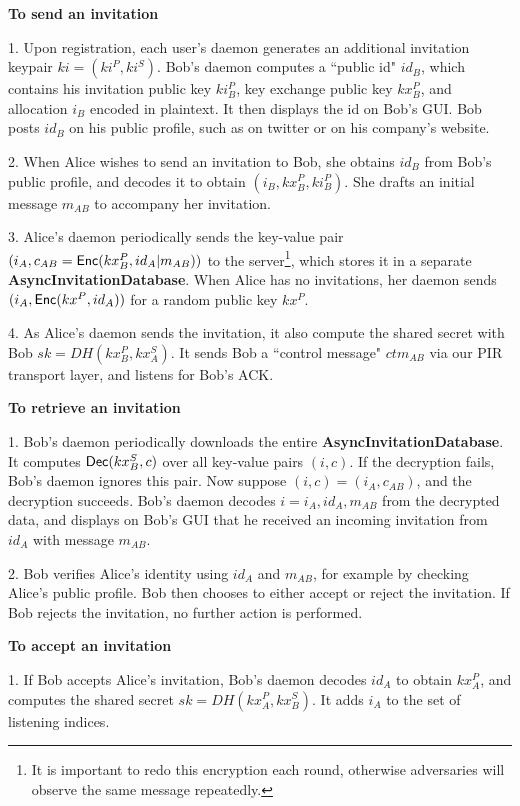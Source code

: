 \textbf{To send an invitation}

1. Upon registration, each user's daemon generates an additional invitation keypair $ki = (ki^P, ki^S)$. Bob's daemon computes a ``public id" $id_B$, which contains his invitation public key $ki_B^P$, key exchange public key $kx_B^P$, and allocation $i_B$ encoded in plaintext. It then displays the id on Bob's GUI. Bob posts $id_B$ on his public profile, such as on twitter or on his company's website.

2. When Alice wishes to send an invitation to Bob, she obtains $id_B$ from Bob's public profile, and decodes it to obtain $(i_B, kx_B^P, ki_B^P)$. She drafts an initial message $m_{AB}$ to accompany her invitation. 

3. Alice's daemon periodically sends the key-value pair $(i_A, c_{AB} = \mathsf{Enc}(kx_B^P, id_A \vert m_{AB}))$ to the server\footnote{It is important to redo this encryption each round, otherwise adversaries will observe the same message repeatedly.}, which stores it in a separate \textbf{AsyncInvitationDatabase}. When Alice has no invitations, her daemon sends $(i_A, \mathsf{Enc}(kx^P, id_A))$ for a random public key $kx^P$.

4. As Alice's daemon sends the invitation, it also compute the shared secret with Bob $sk = DH(kx_B^P, kx^S_A)$. It sends Bob a ``control message" $ctm_{AB}$ via our PIR transport layer, and listens for Bob's ACK.

\textbf{To retrieve an invitation}

1. Bob's daemon periodically downloads the entire \textbf{AsyncInvitationDatabase}. It computes $\mathsf{Dec}(kx^S_B, c)$ over all key-value pairs $(i, c)$. If the decryption fails, Bob's daemon ignores this pair. Now suppose $(i, c) = (i_A, c_{AB})$, and the decryption succeeds. Bob's daemon decodes $i = i_A, id_A, m_{AB}$ from the decrypted data, and displays on Bob's GUI that he received an incoming invitation from $id_A$ with message $m_{AB}$.

2. Bob verifies Alice's identity using $id_A$ and $m_{AB}$, for example by checking Alice's public profile. Bob then chooses to either accept or reject the invitation. If Bob rejects the invitation, no further action is performed. 

\textbf{To accept an invitation}

1. If Bob accepts Alice's invitation, Bob's daemon decodes $id_A$ to obtain $kx_A^P$, and computes the shared secret $sk = DH(kx_A^P, kx_B^S)$. It adds $i_A$ to the set of listening indices.

